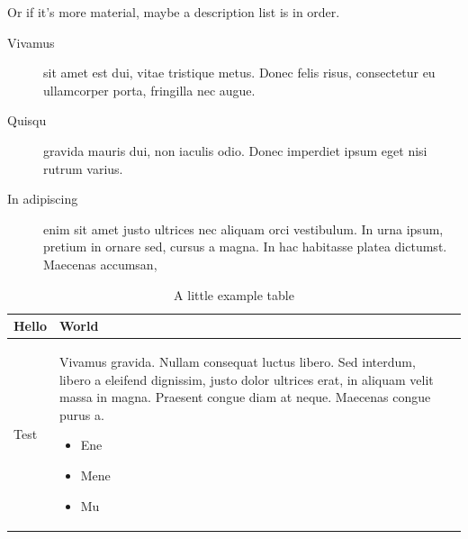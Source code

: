 \documentclass[a4paper,12pt]{book}
\begin{document}
Or if it's more material, maybe a description list is in order.

\begin{description}
  \item[Vivamus] sit amet est dui, vitae tristique metus. Donec felis risus,
  consectetur eu ullamcorper porta, fringilla nec augue.
  \item[Quisqu] gravida
  mauris dui, non iaculis odio. Donec imperdiet ipsum eget nisi rutrum
  varius.
  \item[In adipiscing] enim sit amet justo ultrices nec aliquam orci
  vestibulum. In urna ipsum, pretium in ornare sed, cursus a magna. In hac
  habitasse platea dictumst. Maecenas accumsan,
\end{description}

\begin{table}[htbp]
\begin{center}
\begin{tabular}{|l|l|r|}
\hline
Hello   & World \\ \hline
Test    &
   \begin{minipage}[t]{8cm}
    Vivamus gravida. Nullam consequat luctus libero. Sed interdum, libero
    a eleifend dignissim, justo dolor ultrices erat, in aliquam velit
    massa in magna. Praesent congue diam at neque. Maecenas congue
    purus a.
    \begin{itemize}
      \item Ene
      \item Mene
      \item Mu
    \end{itemize}
    \vspace*{1ex}
   \end{minipage} \\ \hline
\end{tabular}
\end{center}
\caption{A little example table}
\end{table}
\end{document}

